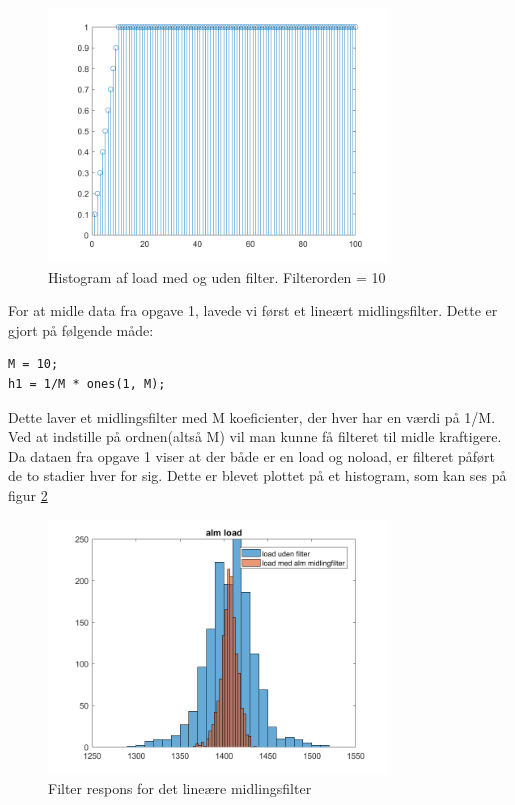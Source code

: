 \documentclass[12pt]{article}
\begin{document}
\begin{figure}[H]
	\centering
	\includegraphics[width=90mm]{Img/respons_alm.png}
	\caption{Histogram af load med og uden filter. Filterorden = 10}
	\label{fig:stem_fir}
\end{figure}

For at midle data fra opgave 1, lavede vi først et lineært midlingsfilter. Dette er gjort på følgende måde:

\begin{lstlisting}[frame=single]  
M = 10;
h1 = 1/M * ones(1, M);
\end{lstlisting}
Dette laver et midlingsfilter med M koeficienter, der hver har en værdi på 1/M. Ved at indstille på ordnen(altså M) vil man kunne få filteret til midle kraftigere. \\

Da dataen fra opgave 1 viser at der både er en load og noload, er filteret påført de to stadier hver for sig. Dette er blevet plottet på et histogram, som kan ses på figur \ref{fig:histogram1}

\begin{figure}[H]
	\centering
	\includegraphics[width=90mm]{Img/Histogram_load_L.png}
	\caption{Filter respons for det lineære midlingsfilter}
	\label{fig:histogram1}
\end{figure}
\end{document}
